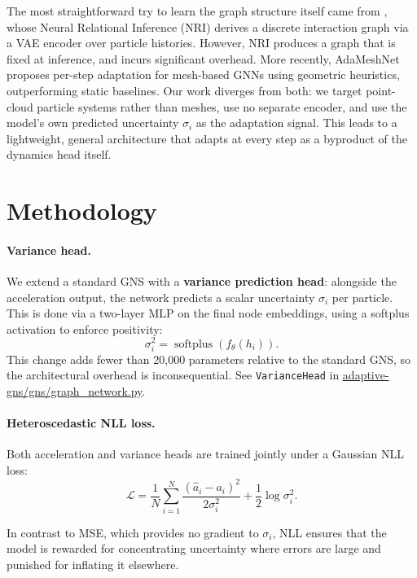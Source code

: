 \documentclass{article}
\begin{document}
The most straightforward try to learn the graph structure itself came from \cite{kipf2018}, whose Neural Relational Inference (NRI) derives a discrete interaction graph via a VAE encoder over particle histories. However, NRI produces a graph that is fixed at inference, and incurs significant overhead. More recently, AdaMeshNet \cite{adameshnet2025} proposes 
per-step adaptation for mesh-based GNNs using geometric heuristics, outperforming 
static baselines. Our work diverges from both: 
we target point-cloud particle systems rather than meshes, use no separate encoder, and use the model's own predicted uncertainty $\sigma_i$ as 
the adaptation signal. This leads to a lightweight, general architecture that adapts at every step as a byproduct of the dynamics head itself.

\section{Methodology}

\paragraph{Variance head.}
We extend a standard GNS with a \textbf{variance prediction head}: alongside the acceleration output, the network predicts a scalar uncertainty $\sigma_i$ per particle. This is done via a two-layer MLP on the final node embeddings, using a softplus activation to enforce positivity: \[
\sigma_i^2 = \operatorname{softplus}(f_{\theta}(h_i)).
\]
This change adds fewer than 20,000 parameters relative to the standard GNS, so the architectural overhead is inconsequential. See \texttt{VarianceHead} in
\url{adaptive-gns/gns/graph_network.py}. 

\paragraph{Heteroscedastic NLL loss.} Both acceleration and variance heads are trained jointly under a Gaussian NLL loss:
\begin{equation}
  \mathcal{L} = \frac{1}{N}\sum_{i=1}^{N} \frac{(\hat{a}_i - a_i)^2}{2\sigma_i^2} + \frac{1}{2}\log \sigma_i^2.
\end{equation}

In contrast to MSE, which provides no gradient to $\sigma_i$, NLL ensures that the model is rewarded for concentrating uncertainty where errors are large and punished for inflating it elsewhere. 
\end{document}
